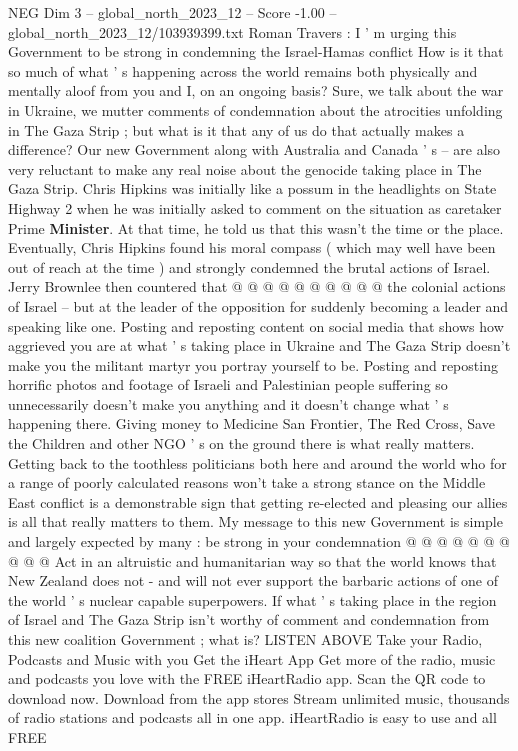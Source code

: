 \begin{textsample}{NEG Dim 3 – global\_north\_2023\_12 – Score -1.00 – global\_north\_2023\_12/103939399.txt}  \label{ex:f3_neg_231}
Roman Travers : I ' m urging this Government to be strong in condemning the Israel-Hamas conflict How is it that so much of what ' s happening across the world remains both physically and mentally aloof from you and I, on an ongoing basis?
Sure, we talk about the war in Ukraine, we mutter comments of condemnation about the atrocities unfolding in The Gaza Strip ; but what is it that any of us do that actually makes a difference?
Our new Government along with Australia and Canada ' s -- are also very reluctant to make any real noise about the genocide taking place in The Gaza Strip.
Chris Hipkins was initially like a possum in the headlights on State Highway 2 when he was initially asked to comment on the situation as caretaker Prime \textbf{Minister}.
At that time, he told us that this wasn't the time or the place.
Eventually, Chris Hipkins found his moral compass ( which may well have been out of reach at the time ) and strongly condemned the brutal actions of Israel.
Jerry Brownlee then countered that @ @ @ @ @ @ @ @ @ @ the colonial actions of Israel -- but at the leader of the opposition for suddenly becoming a leader and speaking like one.
Posting and reposting content on social media that shows how aggrieved you are at what ' s taking place in Ukraine and The Gaza Strip doesn't make you the militant martyr you portray yourself to be.
Posting and reposting horrific photos and footage of Israeli and Palestinian people suffering so unnecessarily doesn't make you anything and it doesn't change what ' s happening there.
Giving money to Medicine San Frontier, The Red Cross, Save the Children and other NGO ' s on the ground there is what really matters.
Getting back to the toothless politicians both here and around the world who for a range of poorly calculated reasons won't take a strong stance on the Middle East conflict is a demonstrable sign that getting re-elected and pleasing our allies is all that really matters to them.
My message to this new Government is simple and largely expected by many : be strong in your condemnation @ @ @ @ @ @ @ @ @ @ Act in an altruistic and humanitarian way so that the world knows that New Zealand does not - and will not ever support the barbaric actions of one of the world ' s nuclear capable superpowers.
If what ' s taking place in the region of Israel and The Gaza Strip isn't worthy of comment and condemnation from this new coalition Government ; what is?
LISTEN ABOVE Take your Radio, Podcasts and Music with you Get the iHeart App Get more of the radio, music and podcasts you love with the FREE iHeartRadio app.
Scan the QR code to download now.
Download from the app stores Stream unlimited music, thousands of radio stations and podcasts all in one app. iHeartRadio is easy to use and all FREE

\end{textsample}
